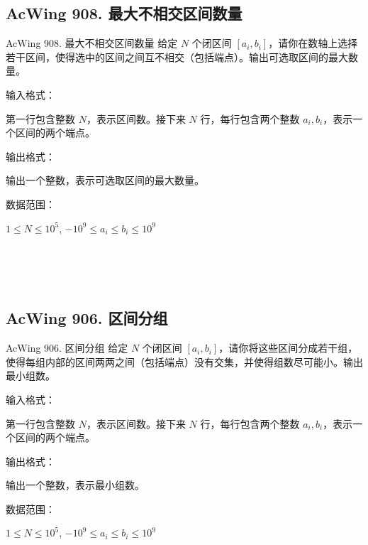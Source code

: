 \subsection{AcWing 908. 最大不相交区间数量}
\begin{titledbox}{AcWing 908. 最大不相交区间数量}
    给定 $N$ 个闭区间 $[a_i,b_i]$，请你在数轴上选择若干区间，使得选中的区间之间互不相交（包括端点）。输出可选取区间的最大数量。

    输入格式：

    第一行包含整数 $N$，表示区间数。接下来 $N$ 行，每行包含两个整数 $a_i,b_i$，表示一个区间的两个端点。

    输出格式：

    输出一个整数，表示可选取区间的最大数量。

    数据范围：

    $1 \le N \le 10^5$, $-10^9 \le a_i \le b_i \le 10^9$

    \begin{inputblock}
         \\
         \\
         \\
    \end{inputblock}
    \begin{outputblock}
    \end{outputblock}
\end{titledbox}

\subsection{AcWing 906. 区间分组}
\begin{titledbox}{AcWing 906. 区间分组}
    给定 $N$ 个闭区间 $[a_i,b_i]$，请你将这些区间分成若干组，使得每组内部的区间两两之间（包括端点）没有交集，并使得组数尽可能小。输出最小组数。

    输入格式：

    第一行包含整数 $N$，表示区间数。接下来 $N$ 行，每行包含两个整数 $a_i,b_i$，表示一个区间的两个端点。

    输出格式：

    输出一个整数，表示最小组数。

    数据范围：

    $1 \le N \le 10^5$, $-10^9 \le a_i \le b_i \le 10^9$

    \begin{inputblock}
         \\
         \\
         \\
    \end{inputblock}
    \begin{outputblock}
    \end{outputblock}
\end{titledbox}


